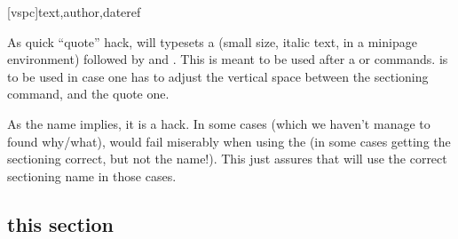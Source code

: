 \documentclass[article,nogeometry,english,tocdepth=3,secdepth=3]{ufrgscca} %
\begin{document}
\begin{codedescribe}{\fancyquote}
	\begin{codesyntax}%
	\tsmacro{\fancyquote}[vspc]{text,author,dateref}
\end{codesyntax}
As quick “quote” hack, \tsmacro{\fancyquote}{} will typesets a  (small size, italic  text, in a minipage environment) followed by  and . This is meant to be used after a \tsmacro{\chapter}{} or \tsmacro{\section}{} commands.  is to be used in case one has to adjust the vertical space between the sectioning command, and the quote one.
\end{codedescribe}


\begin{codedescribe}{}
    \begin{codesyntax}%
    \end{codesyntax}
As the name implies, it is a hack. In some cases (which we haven't manage to found why/what),  would fail miserably when using the \tsmacro{\nameref}{} (in some cases getting the sectioning correct, but not the name!). This just assures that \tsmacro{\nameref}{} will use the correct sectioning name in those cases.
\begin{codestore}[st=d.labelhack]
    \section{this section}\label{somelabel}
\end{codestore}
\end{codedescribe}
\end{document}
